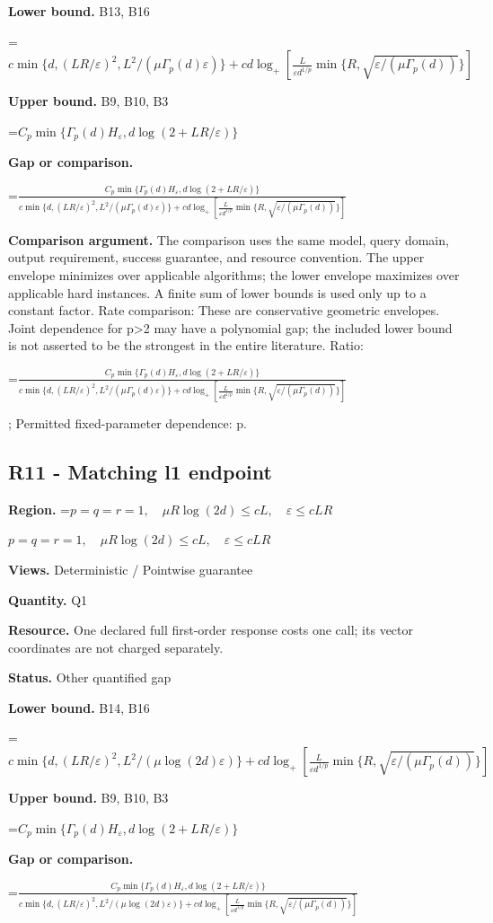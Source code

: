\documentclass[10pt,a4paper]{article}
\newcommand{\AtlasMath}[1]{\par\begingroup\centering\setbox0=\hbox{$\displaystyle #1$}\ifdim\wd0>1.4\linewidth\typeout{ATLAS WIDE FORMULA: \the\wd0}\fi\ifdim\wd0>\linewidth\resizebox{\linewidth}{!}{\box0}\else\box0\fi\par\endgroup}
\newcommand{\AtlasInlineMath}[1]{\begingroup\setbox0=\hbox{$#1$}\ifdim\wd0>.4\linewidth\endgroup\AtlasMath{#1}\else\endgroup$#1$\fi}
\begin{document}
\textbf{Lower bound.} B13, B16

\AtlasMath{c\min\{d,(LR/\varepsilon)^2,L^2/(\mu\Gamma_p(d)\varepsilon)\}+cd\log_+[\frac{L}{\varepsilon d^{1/p}}\min\{R,\sqrt{\varepsilon/(\mu\Gamma_p(d))}\}]}
\textbf{Upper bound.} B9, B10, B3

\AtlasMath{C_p\min\{\Gamma_p(d)H_\varepsilon,d\log(2+LR/\varepsilon)\}}
\textbf{Gap or comparison.} 
\AtlasMath{\frac{C_p\min\{\Gamma_p(d)H_\varepsilon,d\log(2+LR/\varepsilon)\}}{c\min\{d,(LR/\varepsilon)^2,L^2/(\mu\Gamma_p(d)\varepsilon)\}+cd\log_+[\frac{L}{\varepsilon d^{1/p}}\min\{R,\sqrt{\varepsilon/(\mu\Gamma_p(d))}\}]}}


\textbf{Comparison argument.} The comparison uses the same model, query domain, output requirement, success guarantee, and resource convention. The upper envelope minimizes over applicable algorithms; the lower envelope maximizes over applicable hard instances. A finite sum of lower bounds is used only up to a constant factor. Rate comparison: These are conservative geometric envelopes. Joint dependence for p>2 may have a polynomial gap; the included lower bound is not asserted to be the strongest in the entire literature. Ratio: 
\AtlasMath{\frac{C_p\min\{\Gamma_p(d)H_\varepsilon,d\log(2+LR/\varepsilon)\}}{c\min\{d,(LR/\varepsilon)^2,L^2/(\mu\Gamma_p(d)\varepsilon)\}+cd\log_+[\frac{L}{\varepsilon d^{1/p}}\min\{R,\sqrt{\varepsilon/(\mu\Gamma_p(d))}\}]}}
; Permitted fixed-parameter dependence: p.

\subsection{R11 - Matching l1 endpoint}
\textbf{Region.} \AtlasInlineMath{p=q=r=1,\quad\mu R\log(2d)\le cL,\quad\varepsilon\le cLR}

\textbf{Views.} Deterministic / Pointwise guarantee

\textbf{Quantity.} Q1

\textbf{Resource.} One declared full first-order response costs one call; its vector coordinates are not charged separately.

\textbf{Status.} Other quantified gap

\textbf{Lower bound.} B14, B16

\AtlasMath{c\min\{d,(LR/\varepsilon)^2,L^2/(\mu\log(2d)\varepsilon)\}+cd\log_+[\frac{L}{\varepsilon d^{1/p}}\min\{R,\sqrt{\varepsilon/(\mu\Gamma_p(d))}\}]}
\textbf{Upper bound.} B9, B10, B3

\AtlasMath{C_p\min\{\Gamma_p(d)H_\varepsilon,d\log(2+LR/\varepsilon)\}}
\textbf{Gap or comparison.} 
\AtlasMath{\frac{C_p\min\{\Gamma_p(d)H_\varepsilon,d\log(2+LR/\varepsilon)\}}{c\min\{d,(LR/\varepsilon)^2,L^2/(\mu\log(2d)\varepsilon)\}+cd\log_+[\frac{L}{\varepsilon d^{1/p}}\min\{R,\sqrt{\varepsilon/(\mu\Gamma_p(d))}\}]}}
\end{document}

